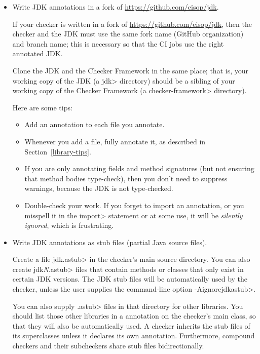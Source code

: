 \begin{itemize}
\item
  Write JDK annotations in a fork of
  \url{https://github.com/eisop/jdk}.

  If your checker is written in a fork of
  \url{https://github.com/eisop/jdk}, then the checker and the JDK must
  use the same fork name (GitHub organization) and branch name; this is
  necessary so that the CI jobs use the right annotated JDK.

  Clone the JDK and the Checker Framework in the same place; that is, your
  working copy of the JDK (a \<jdk> directory) should be a sibling of your
  working copy of the Checker Framework (a \<checker-framework> directory).

  Here are some tips:
  \begin{itemize}
  \item
    Add
    an  annotation to each file you annotate.
  \item
    Whenever you add a file, fully annotate it, as described in
    Section~\ref{library-tips}.
  \item
    If you are only annotating fields and method signatures (but not
    ensuring that method bodies type-check), then you don't need to suppress
    warnings, because the JDK is not type-checked.
  \item
    Double-check your work.
    If you forget to import an annotation, or you misspell it in the
    \<import> statement or at some use, it will be \emph{silently ignored},
    which is frustrating.
  \end{itemize}

\item
  Write JDK annotations as stub files (partial Java source files).

  Create a file \<jdk.astub> in
the checker's main source directory.  You can also create \<jdk\emph{N}.astub> files that contain methods
or classes that only exist in certain JDK versions.
The JDK stub files will be automatically used by the
checker, unless the user supplies the command-line option \<-Aignorejdkastub>.

You can also supply \<.astub> files in that directory for other libraries.
You should list those other libraries in a
 annotation on the checker's main
class, so that they will also be automatically used.
A checker inherits the stub files of its superclasses unless it declares its own
 annotation. Furthermore, compound checkers
and their subcheckers share stub files bidirectionally.


\end{itemize}
